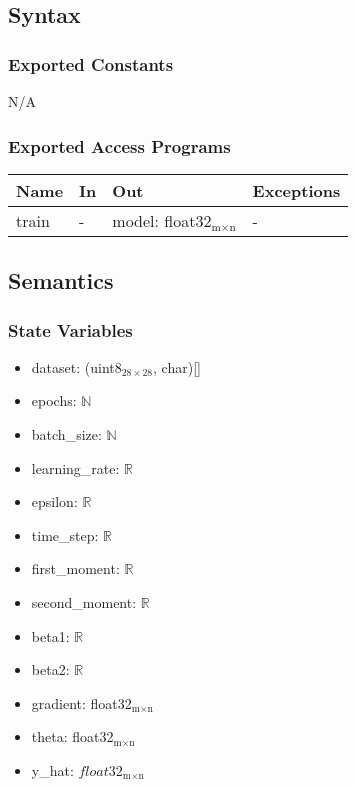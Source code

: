 \documentclass[12pt, titlepage]{article}
\begin{document}
\subsection{Syntax}

\subsubsection{Exported Constants}

N/A

\subsubsection{Exported Access Programs}

\begin{center}
\begin{tabular}{p{2cm} p{4cm} p{4cm} p{2cm}}
\hline
\textbf{Name} & \textbf{In} & \textbf{Out} & \textbf{Exceptions} \\
\hline
train & - & model: float32$_{\text{m} \times \text{n}}$ & - \\
\hline
\end{tabular}
\end{center}

\subsection{Semantics}

\subsubsection{State Variables}

\begin{itemize}
  \item dataset: (uint8$_{28 \times 28}$, char)[]
  \item epochs: $\mathbb{N}$
  \item batch\_size: $\mathbb{N}$
  \item learning\_rate: $\mathbb{R}$
  \item epsilon: $\mathbb{R}$
  \item time\_step: $\mathbb{R}$
  \item first\_moment: $\mathbb{R}$
  \item second\_moment: $\mathbb{R}$
  \item beta1: $\mathbb{R}$
  \item beta2: $\mathbb{R}$
  \item gradient: float32$_{\text{m} \times \text{n}}$
  \item theta: float32$_{\text{m} \times \text{n}}$
  \item y\_hat: $float32_{\text{m} \times \text{n}}$
\end{itemize}
\end{document}
